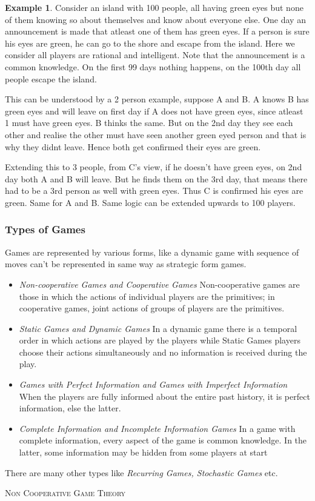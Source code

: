 \documentclass{article}
\theoremstyle{definition}
\newtheorem{example}{Example}[section]
\begin{document}
\begin{example} 
Consider an island with 100 people, all having green eyes but none of them knowing so about themselves and know about everyone else. One day an announcement is made that atleast one of them has green eyes. If a person is sure his eyes are green, he can go to the shore and escape from the island. Here we consider all players are rational and intelligent. Note that the announcement is a common knowledge. On the first 99 days nothing happens, on the 100th day all people escape the island.

This can be understood by a 2 person example, suppose A and B. A knows B has green eyes and will leave on first day if A does not have green eyes, since atleast 1 must have green eyes. B thinks the same. But on the 2nd day they see each other and realise the other must have seen another green eyed person and that is why they didnt leave. Hence both get confirmed their eyes are green.

Extending this to 3 people, from C's view, if he doesn't have green eyes, on 2nd day both A and B will leave. But he finds them on the 3rd day, that means there had to be a 3rd person as well with green eyes. Thus C is confirmed his eyes are green. Same for A and B. Same logic can be extended upwards to 100 players.
\end{example}
\subsubsection{Types of Games}
Games are represented by various forms, like a dynamic game with sequence of moves can't be represented in same way as strategic form games.
\begin{itemize}
	\item \textit{Non-cooperative Games and Cooperative Games} Non-cooperative games are those in which the actions of individual players are the primitives; in cooperative games, joint actions of groups of players are the primitives.
	\item \textit{Static Games and Dynamic Games} In a dynamic game there is a temporal order in which actions are played by the players while Static Games players choose their actions simultaneously and no information is received during the play.
	\item \textit{Games with Perfect Information and Games with Imperfect Information} When the players are fully informed about the entire past history, it is perfect information, else the latter.
	\item \textit{Complete Information and Incomplete Information Games} In a game with complete information, every aspect of the game is common knowledge. In the latter, some information may be hidden from some players at start
\end{itemize}
There are many other types like \textit{Recurring Games, Stochastic Games} etc.
\newpage
\begin{center}
\normalfont\LARGE\scshape{Non Cooperative Game Theory}
\end{center}
\end{document}
